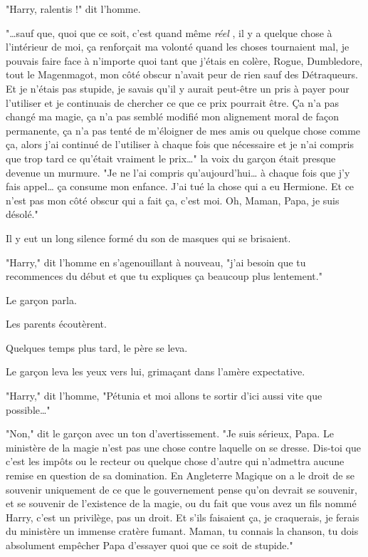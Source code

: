 "Harry, ralentis !" dit l'homme.

"…sauf que, quoi que ce soit, c'est quand même \emph{réel} , il y a quelque chose à l'intérieur de moi, ça renforçait ma volonté quand les choses tournaient mal, je pouvais faire face à n'importe quoi tant que j'étais en colère, Rogue, Dumbledore, tout le Magenmagot, mon côté obscur n'avait peur de rien sauf des Détraqueurs. Et je n'étais pas stupide, je savais qu'il y aurait peut-être un pris à payer pour l'utiliser et je continuais de chercher ce que ce prix pourrait être. Ça n'a pas changé ma magie, ça n'a pas semblé modifié mon alignement moral de façon permanente, ça n'a pas tenté de m'éloigner de mes amis ou quelque chose comme ça, alors j'ai continué de l'utiliser à chaque fois que nécessaire et je n'ai compris que trop tard ce qu'était vraiment le prix…" la voix du garçon était presque devenue un murmure. "Je ne l'ai compris qu'aujourd'hui… à chaque fois que j'y fais appel… ça consume mon enfance. J'ai tué la chose qui a eu Hermione. Et ce n'est pas mon côté obscur qui a fait ça, c'est moi. Oh, Maman, Papa, je suis désolé."

Il y eut un long silence formé du son de masques qui se brisaient.

"Harry," dit l'homme en s'agenouillant à nouveau, "j'ai besoin que tu recommences du début et que tu expliques ça beaucoup plus lentement."

Le garçon parla.

Les parents écoutèrent.

Quelques temps plus tard, le père se leva.

Le garçon leva les yeux vers lui, grimaçant dans l'amère expectative.

"Harry," dit l'homme, "Pétunia et moi allons te sortir d'ici aussi vite que possible…"

"Non," dit le garçon avec un ton d'avertissement. "Je suis sérieux, Papa. Le ministère de la magie n'est pas une chose contre laquelle on se dresse. Dis-toi que c'est les impôts ou le recteur ou quelque chose d'autre qui n'admettra aucune remise en question de sa domination. En Angleterre Magique on a le droit de se souvenir uniquement de ce que le gouvernement pense qu'on devrait se souvenir, et se souvenir de l'existence de la magie, ou du fait que vous avez un fils nommé Harry, c'est un privilège, pas un droit. Et s'ils faisaient ça, je craquerais, je ferais du ministère un immense cratère fumant. Maman, tu connais la chanson, tu dois absolument empêcher Papa d'essayer quoi que ce soit de stupide."

